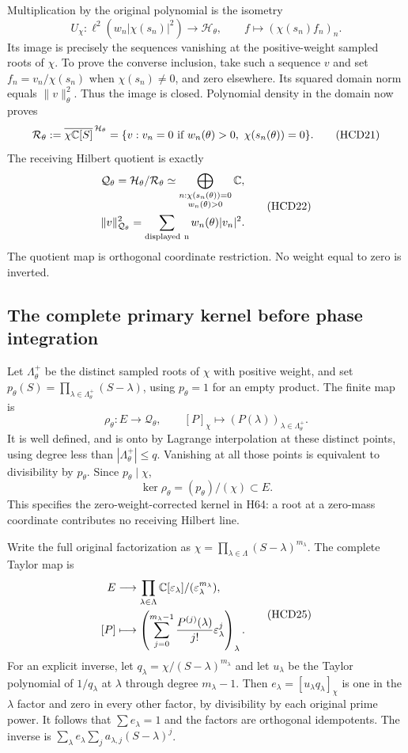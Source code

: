 Multiplication by the original polynomial is the isometry
\[
 U_\chi:\ell^2(w_n|\chi(s_n)|^2)\longrightarrow\mathcal H_\theta,
 \qquad f\longmapsto(\chi(s_n)f_n)_n.
 \tag{HCD20}
\]
Its image is precisely the sequences vanishing at the
positive-weight sampled roots of $\chi$. To prove the
converse inclusion, take such a sequence $v$ and set
$f_n=v_n/\chi(s_n)$ when $\chi(s_n)\ne0$, and zero
elsewhere. Its squared domain norm equals $\|v\|_\theta^2$.
Thus the image is closed. Polynomial density in the domain
now proves
\[
 \mathcal R_\theta:=
 \overline{\chi\mathbb C[S]}^{\,\mathcal H_\theta}
 =\{v:v_n=0\text{ if }w_n(\theta)>0,\ \chi(s_n(\theta))=0\}.
 \tag{HCD21}
\]
The receiving Hilbert quotient is exactly
\[
 \begin{gathered}
 \mathcal Q_\theta=\mathcal H_\theta/\mathcal R_\theta
 \simeq
 \bigoplus_{\substack{n:\chi(s_n(\theta))=0\\w_n(\theta)>0}}\mathbb C,\\
 \|v\|_{\mathcal Q_\theta}^2
 =\sum_{\rm displayed\ n}w_n(\theta)|v_n|^2.
 \end{gathered}
 \tag{HCD22}
\]
The quotient map is orthogonal coordinate restriction.
No weight equal to zero is inverted.

\subsection{The complete primary kernel before phase integration}

Let $\Lambda_\theta^+$ be the distinct sampled roots of
$\chi$ with positive weight, and set
$p_\theta(S)=\prod_{\lambda\in\Lambda_\theta^+}(S-\lambda)$,
using $p_\theta=1$ for an empty product.
The finite map is
\[
 \rho_\theta:E\longrightarrow\mathcal Q_\theta,\qquad
 [P]_\chi\longmapsto(P(\lambda))_{\lambda\in\Lambda_\theta^+}.
 \tag{HCD23}
\]
It is well defined, and is onto by Lagrange interpolation
at these distinct points, using degree less than
$|\Lambda_\theta^+|\le q$. Vanishing at all those points
is equivalent to divisibility by $p_\theta$. Since
$p_\theta\mid\chi$,
\[
 \ker\rho_\theta=(p_\theta)/(\chi)\subset E.
 \tag{HCD24}
\]
This specifies the zero-weight-corrected kernel in H64:
a root at a zero-mass coordinate contributes no receiving
Hilbert line.

Write the full original factorization as
$\chi=\prod_{\lambda\in\Lambda}(S-\lambda)^{m_\lambda}$.
The complete Taylor map is
\[
 \begin{split}
 E&\longrightarrow\prod_{\lambda\in\Lambda}
 \mathbb C[\varepsilon_\lambda]/(\varepsilon_\lambda^{m_\lambda}),\\
 [P]&\longmapsto\left(
 \sum_{j=0}^{m_\lambda-1}\frac{P^{(j)}(\lambda)}{j!}
 \varepsilon_\lambda^j\right)_\lambda.
 \end{split}
 \tag{HCD25}
\]
For an explicit inverse, let
$q_\lambda=\chi/(S-\lambda)^{m_\lambda}$ and let
$u_\lambda$ be the Taylor polynomial of $1/q_\lambda$
at $\lambda$ through degree $m_\lambda-1$.
Then $e_\lambda=[u_\lambda q_\lambda]_\chi$ is one
in the $\lambda$ factor and zero in every other factor,
by divisibility by each original prime power. It follows
that $\sum e_\lambda=1$ and the factors are orthogonal
idempotents. The inverse is
$\sum_\lambda e_\lambda\sum_j a_{\lambda,j}(S-\lambda)^j$.

